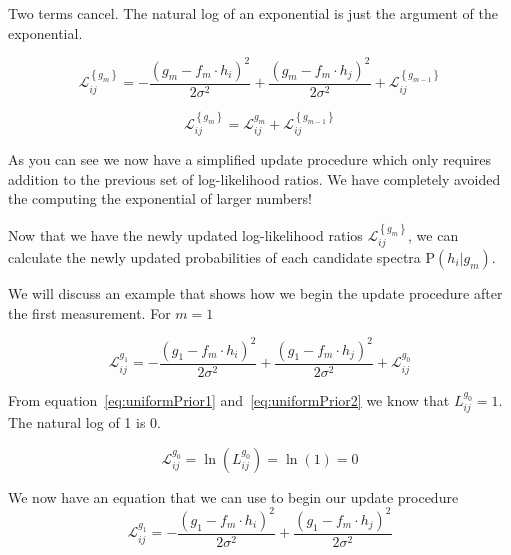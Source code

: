 \noindent Two terms cancel. The natural log of an exponential is just the argument of the exponential.

\begin{equation}\label{eq:LLRUpdate}
    \mathscr{L}_{ij}^{\left\{g_m\right\}}
    =
    -
    \frac
    {
        \left( g_m - f_m \cdot {h}_i \right)^2
    }
    {
        2 \sigma^2
    }
    +
    \frac
    {
        \left( g_m - f_m \cdot {h}_j \right)^2
    }
    {
        2 \sigma^2
    }
    +
    \mathscr{L}_{ij}^{\left\{g_{m-1}\right\}}
\end{equation}

\begin{equation}\label{eq:LLRUpdate2}
    \boxed{
        \mathscr{L}_{ij}^{\left\{g_m\right\}}
        =
        \mathscr{L}_{ij}^{g_m}
        +
        \mathscr{L}_{ij}^{\left\{g_{m-1}\right\}}
    }
\end{equation}


\noindent As you can see we now have a simplified update procedure which only requires addition to the previous set of log-likelihood ratios. We have completely avoided the computing the exponential of larger numbers!

Now that we have the newly updated log-likelihood ratios $ \mathscr{L}_{ij}^{\left\{g_m\right\}} $, we can calculate the newly updated probabilities of each candidate spectra $\mbox{P}({h}_i | {g_m})$.

We will discuss an example that shows how we begin the update procedure after the first measurement. For $m = 1$

\begin{equation}
    \mathscr{L}_{ij}^{g_1}
    =
    -
    \frac
    {
        \left( g_1 - f_m \cdot {h}_i \right)^2
    }
    {
        2 \sigma^2
    }
    +
    \frac
    {
        \left( g_1 - f_m \cdot {h}_j \right)^2
    }
    {
        2 \sigma^2
    }
    +
    \mathscr{L}_{ij}^{g_{0}}
\end{equation}


\noindent From equation~\ref{eq:uniformPrior1} and~\ref{eq:uniformPrior2} we know that $L_{ij}^{g_{0}} = 1$. The natural log of 1 is 0.

\begin{equation}
    \mathscr{L}_{ij}^{g_{0}}
    =
    \ln{
    \left(
        L_{ij}^{g_{0}}
    \right)
    }
    =
    \ln{
    \left(
        1
    \right)
    }
    =
    0
\end{equation}

\noindent We now have an equation that we can use to begin our update procedure
\begin{equation}
    \mathscr{L}_{ij}^{g_1}
    =
    -
    \frac
    {
        \left( g_1 - f_m \cdot {h}_i \right)^2
    }
    {
        2 \sigma^2
    }
    +
    \frac
    {
        \left( g_1 - f_m \cdot {h}_j \right)^2
    }
    {
        2 \sigma^2
    }
\end{equation}





